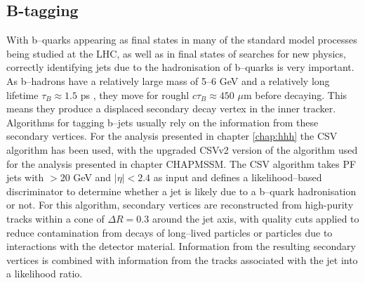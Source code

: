 \subsection{B-tagging}
\label{sec:objects_jets_btag}
With b--quarks appearing as final states in many of the standard model
processes being studied at the \ac{LHC}, as well as in final states
of searches for new physics, correctly identifying jets due to the hadronisation
of b--quarks is very important. As b--hadrons have a relatively
large mass of 5--6 GeV and a relatively long lifetime $\tau_B \approx 1.5$ ps \cite{pdg-2014},
they move for roughl $c\tau_B \approx 450$ $\mu$m before decaying. This means 
they produce a displaced secondary decay vertex in the inner tracker.
Algorithms for tagging b--jets usually rely on the information
from these secondary vertices.
For the analysis presented in chapter \ref{chap:hhh}
the \ac{CSV} algorithm \cite{cms-btag-paper} has been used, with the upgraded
\ac{CSV}v2 version of the algorithm \cite{cms-btag-run2} used for the analysis presented in chapter CHAPMSSM. 
The \ac{CSV} algorithm takes \ac{PF} jets with \pT$ > 20$ GeV and $|\eta|<2.4$ as input and 
defines a likelihood--based discriminator to determine 
whether a jet is likely due to a b--quark hadronisation or not.
For this algorithm, secondary vertices are reconstructed from high-purity tracks
within a cone of $\Delta R = 0.3$ around the jet axis, with quality cuts applied
to reduce contamination from decays of long--lived particles or particles due 
to interactions with the detector material. Information from the resulting
secondary vertices is combined with information from the tracks associated
with the jet into a likelihood ratio.

